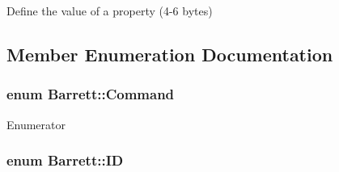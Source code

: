 Define the value of a property (4-\/6 bytes) 



\subsection{Member Enumeration Documentation}
\hypertarget{struct_barrett_abbf4a39cfafcb46bd73c64dc3c2fcd9c}{
\subsubsection[{Command}]{\setlength{\rightskip}{0pt plus 5cm}enum {\bf Barrett\-::\-Command}}}\label{struct_barrett_abbf4a39cfafcb46bd73c64dc3c2fcd9c}
\begin{Desc}
\item[Enumerator]\par
\begin{description}
\item[{\em 
\hypertarget{struct_barrett_abbf4a39cfafcb46bd73c64dc3c2fcd9caf578b43d6ffa23cfd7930e2bad8781cb}{G\-E\-T}\label{struct_barrett_abbf4a39cfafcb46bd73c64dc3c2fcd9caf578b43d6ffa23cfd7930e2bad8781cb}
}]\item[{\em 
\hypertarget{struct_barrett_abbf4a39cfafcb46bd73c64dc3c2fcd9ca0a2114290bcdc20151eebb58d589d351}{S\-E\-T}\label{struct_barrett_abbf4a39cfafcb46bd73c64dc3c2fcd9ca0a2114290bcdc20151eebb58d589d351}
}]\end{description}
\end{Desc}
\hypertarget{struct_barrett_a317dfaed9982ffc28166e537d774bd16}{
\subsubsection[{I\-D}]{\setlength{\rightskip}{0pt plus 5cm}enum {\bf Barrett\-::\-I\-D}}}\label{struct_barrett_a317dfaed9982ffc28166e537d774bd16}
